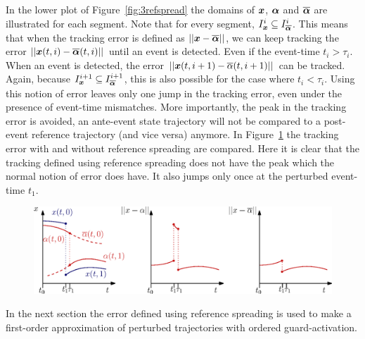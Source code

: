 \documentclass[../DC2017114Bouma.tex]{subfiles}
\begin{document}
In the lower plot of Figure~\ref{fig:3refspread} the domains of ${\boldsymbol{x}}$, $\boldsymbol{\alpha}$ and $\overline{\boldsymbol{\alpha}}$ are illustrated for each segment. Note that for every segment, $I_{{\boldsymbol{x}}}^i\subseteq I_{\overline{\boldsymbol{\alpha}}}^i$. This means that when the tracking error is defined as $||{\boldsymbol{x}}-\overline{\boldsymbol{\alpha}}||$, we can keep tracking the error $||{\boldsymbol{x}}(t,i)-\overline{\boldsymbol{\alpha}}(t,i)||$ until an event is detected. Even if the event-time $t_i>\tau_i$. When an event is detected, the error  $||{\boldsymbol{x}}(t,i+1)-\overline{\alpha}(t,i+1)||$ can be tracked. Again, because $I_{{\boldsymbol{x}}}^{i+1}\subseteq I_{\overline{\boldsymbol{\alpha}}}^{i+1}$, this is also possible for the case where $t_i<\tau_i$. Using this notion of error leaves only one jump in the tracking error, even under the presence of event-time mismatches. More importantly, the peak in the tracking error is avoided, an ante-event state trajectory will not be compared to a post-event reference trajectory (and vice versa) anymore. In Figure~\ref{fig:3refspreaderrors} the tracking error with and without reference spreading are compared. Here it is clear that the tracking defined using reference spreading does not have the peak which the normal notion of error does have. It also jumps only once at the perturbed event-time $t_1$.
\begin{figure}[h]
\centering
\includegraphics[width=\textwidth]{refspreaderrors.eps}\caption{} \label{fig:3refspreaderrors}
\end{figure}

In the next section the error defined using reference spreading is used to make a first-order approximation of perturbed trajectories with ordered guard-activation.
\end{document}
